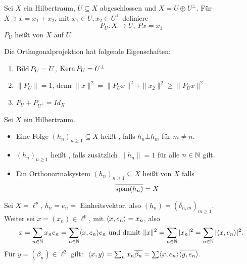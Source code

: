 \begin{definition*}
	Sei $X$ ein Hilbertraum, $U \subseteq X$ abgeschlossen und $X = U \oplus U^{\bot}$. Für $X \ni x = x_{1} + x_{2}$, mit $x_{1} \in U, x_{2} \in U^{\bot}$ definiere
		\[ P_{U} \colon X \rightarrow U, ~ P x = x_{1} \]
		$P_{U}$ hei{\ss}t  von $X$ auf $U$.	
\end{definition*}


\begin{folgerung} \label{folg-16.4}
	Die Orthogonalprojektion hat folgende Eigenschaften:
	\begin{enumerate}[label=\alph*\upshape)]
		\item $\mathop{\rm Bild}\nolimits P_{U} = U$, $\mathop{\rm Kern}\nolimits P_{U} = U^{\bot}$
		\item $\| P_{U} \| = 1$, denn $\| x \|^{2} = \| P_{U} x \|^{2} + \| x_{2} \|^{2} \geq \| P_{U} x \|^{2}$
		\item $P_{U} + P_{U^{\bot}} = Id_{X}$
	\end{enumerate}	
\end{folgerung}

\newpage %

\begin{definition}
	Sei $X$ ein Hilbertraum.
	\begin{itemize}
		\item Eine Folge $(h_{n})_{n \geq 1} \subseteq X$ hei{\ss}t , falls $h_{n} \bot h_{m}$ für $m \neq n$.
		\item $(h_{n})_{n \geq 1}$ hei{\ss}t , falls zusätzlich $\| h_{n} \| = 1$ für alle $n \in \mathbb{N}$ gilt.
		\item Ein Orthonormalsystem $(h_{n})_{n \geq 1} \subseteq X$ hei{\ss}t  von $X$ falls \[ \overline{\operatorname{span}(h_{n})} = X \]
	\end{itemize}
\end{definition}


\begin{beispiel}
	Sei $X = \ell^{p}$, $h_{n} = e_{n} =$ Einheitsvektor, also $(h_{n}) = ( \delta_{n, m} )_{m \geq 1}$. \\
	Weiter sei $x = (x_{n}) \in \ell^{p}$, mit $\langle x , e_{n} \rangle = x_{n}$, also 
	\[ x = \sum_{n \in \mathbb{N}} x_{n} e_{n} = \sum_{n \in \mathbb{N}} \langle x , e_{n} \rangle e_{n} \text{ und damit } \| x \|^{2} = \sum_{n \in \mathbb{N}} |x_{n}|^{2} = \sum_{n \in \mathbb{N}} | \langle x , e_{n} \rangle |^{2}. \]
	Für $y = (\beta_{n}) \in \ell^{2}$ gilt: $ $ $\langle x , y \rangle = \sum_{n} x_{n} \overline{\beta_{n}} = \sum \langle x , e_{n} \rangle \overline{ \langle y , e_{n} \rangle }$.
\end{beispiel}


